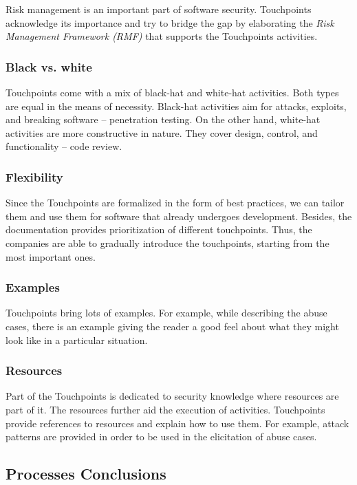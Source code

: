 \documentclass[12pt,a4,twoside]{article}
\begin{document}
Risk management is an important part of software security. Touchpoints acknowledge its importance and try to bridge the gap by elaborating the \textit{Risk Management Framework (RMF)} that supports the Touchpoints activities.

\subsubsection{Black vs. white}

Touchpoints come with a mix of black-hat and white-hat activities. Both types are equal in the means of necessity. Black-hat activities aim for attacks, exploits, and breaking software -- penetration testing. On the other hand, white-hat activities are more constructive in nature. They cover design, control, and functionality -- code review.

\subsubsection{Flexibility}

Since the Touchpoints are formalized in the form of best practices, we can tailor them and use them for software that already undergoes development. Besides, the documentation provides prioritization of different touchpoints. Thus, the companies are able to gradually introduce the touchpoints, starting from the most important ones.

\subsubsection{Examples}

Touchpoints bring lots of examples. For example, while describing the abuse cases, there is an example giving the reader a good feel about what they might look like in a particular situation.

\subsubsection{Resources}

Part of the Touchpoints is dedicated to security knowledge where resources are part of it. The resources further aid the execution of activities. Touchpoints provide references to resources and explain how to use them. For example, attack patterns are provided in order to be used in the elicitation of abuse cases.

\subsection{Processes Conclusions}
\end{document}
